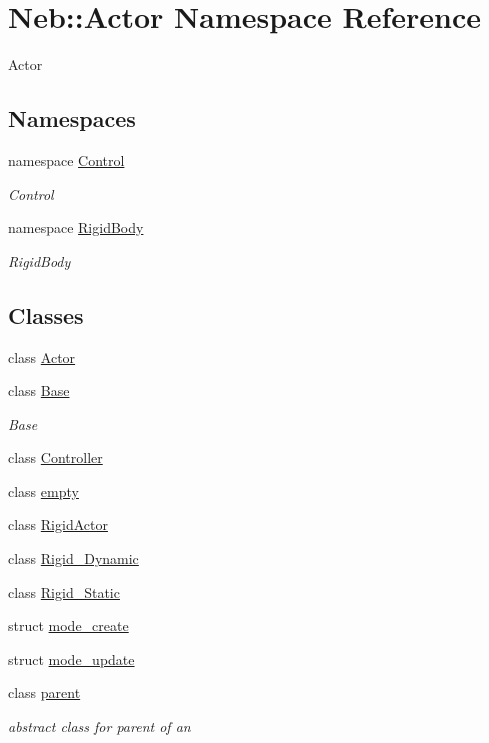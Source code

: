 \hypertarget{namespaceNeb_1_1Actor}{\section{\-Neb\-:\-:\-Actor \-Namespace \-Reference}
\label{namespaceNeb_1_1Actor}
}


\-Actor  


\subsection*{\-Namespaces}
\begin{DoxyCompactItemize}
\item 
namespace \hyperlink{namespaceNeb_1_1Actor_1_1Control}{\-Control}
\begin{DoxyCompactList}\small\item\em \-Control \end{DoxyCompactList}\item 
namespace \hyperlink{namespaceNeb_1_1Actor_1_1RigidBody}{\-Rigid\-Body}
\begin{DoxyCompactList}\small\item\em \-Rigid\-Body \end{DoxyCompactList}\end{DoxyCompactItemize}
\subsection*{\-Classes}
\begin{DoxyCompactItemize}
\item 
class \hyperlink{classNeb_1_1Actor_1_1Actor}{\-Actor}
\item 
class \hyperlink{classNeb_1_1Actor_1_1Base}{\-Base}
\begin{DoxyCompactList}\small\item\em \-Base \end{DoxyCompactList}\item 
class \hyperlink{classNeb_1_1Actor_1_1Controller}{\-Controller}
\item 
class \hyperlink{classNeb_1_1Actor_1_1empty}{empty}
\item 
class \hyperlink{classNeb_1_1Actor_1_1RigidActor}{\-Rigid\-Actor}
\item 
class \hyperlink{classNeb_1_1Actor_1_1Rigid__Dynamic}{\-Rigid\-\_\-\-Dynamic}
\item 
class \hyperlink{classNeb_1_1Actor_1_1Rigid__Static}{\-Rigid\-\_\-\-Static}
\item 
struct \hyperlink{structNeb_1_1Actor_1_1mode__create}{mode\-\_\-create}
\item 
struct \hyperlink{structNeb_1_1Actor_1_1mode__update}{mode\-\_\-update}
\item 
class \hyperlink{classNeb_1_1Actor_1_1parent}{parent}
\begin{DoxyCompactList}\small\item\em abstract class for parent of an  \end{DoxyCompactList}\end{DoxyCompactItemize}
